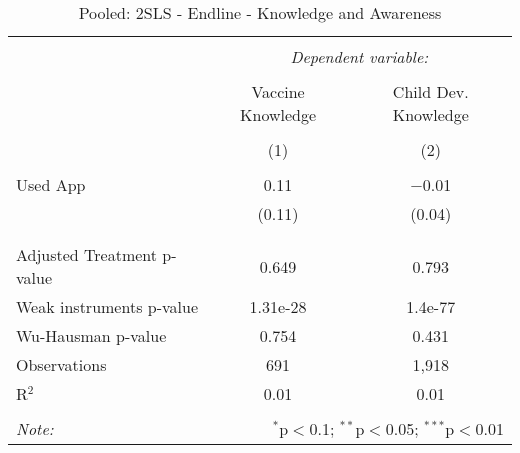 
\begin{table}[!htbp] \centering 
  \caption{Pooled: 2SLS - Endline - Knowledge and Awareness} 
  \label{tbl:Pooled: 2SLS - Endline - Knowledge and Awareness} 
\begin{tabular}{@{\extracolsep{5pt}}lcc} 
\\[-1.8ex]\hline 
\hline \\[-1.8ex] 
 & \multicolumn{2}{c}{\textit{Dependent variable:}} \\ 
\cline{2-3} 
\\[-1.8ex] & Vaccine Knowledge & Child Dev. Knowledge \\ 
\\[-1.8ex] & (1) & (2)\\ 
\hline \\[-1.8ex] 
 Used App & 0.11 & $-$0.01 \\ 
  & (0.11) & (0.04) \\ 
  & & \\ 
\hline \\[-1.8ex] 
Adjusted Treatment p-value & 0.649 & 0.793 \\ 
Weak instruments p-value & 1.31e-28 & 1.4e-77 \\ 
Wu-Hausman p-value & 0.754 & 0.431 \\ 
Observations & 691 & 1,918 \\ 
R$^{2}$ & 0.01 & 0.01 \\ 
\hline 
\hline \\[-1.8ex] 
\textit{Note:}  & \multicolumn{2}{r}{$^{*}$p$<$0.1; $^{**}$p$<$0.05; $^{***}$p$<$0.01} \\ 
\end{tabular} 
\end{table} 

